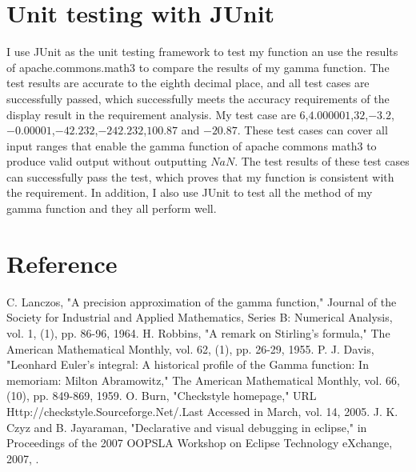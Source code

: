 \documentclass[12pt]{extarticle}
\newcommand{\<}{\langle}
\renewcommand{\>}{\rangle}
\theoremstyle{definition}
\begin{document}
\section{Unit testing with JUnit}
\indent
I use JUnit as the unit testing framework to test my function an use the results of apache.commons.math3 to compare the results of my gamma function. The test results are accurate to the eighth decimal place, and all test cases are successfully passed, which successfully meets the accuracy requirements of the display result in the requirement analysis.
\newline
\indent
My test case are $6$,$4.000001$,$32$,$-3.2$,$-0.00001$,$-42.232$,$-242.232$,$100.87$ and $-20.87$. These test cases can cover all input ranges that enable the gamma function of apache commons math3 to produce valid output without outputting $NaN$. The test results of these test cases can successfully pass the test, which proves that my function is consistent with the requirement.
\newline
\indent
In addition, I also use JUnit to test all the method of my gamma function and they all perform well.
\section{Reference}

\noindent[1] C. Lanczos, "A precision approximation of the gamma function," Journal of the Society for Industrial and Applied Mathematics, Series B: Numerical Analysis, vol. 1, (1), pp. 86-96, 1964.
\newline
[2] H. Robbins, "A remark on Stirling's formula," The American Mathematical Monthly, vol. 62, (1), pp. 26-29, 1955.
\newline
[3] P. J. Davis, "Leonhard Euler's integral: A historical profile of the Gamma function: In memoriam: Milton Abramowitz," The American Mathematical Monthly, vol. 66, (10), pp. 849-869, 1959. 
\newline
[4] O. Burn, "Checkstyle homepage," URL Http://checkstyle.Sourceforge.Net/.Last Accessed in March, vol. 14, 2005.
\newline
[5] J. K. Czyz and B. Jayaraman, "Declarative and visual debugging in eclipse," in Proceedings of the 2007 OOPSLA Workshop on Eclipse Technology eXchange, 2007, . 
\end{document}
